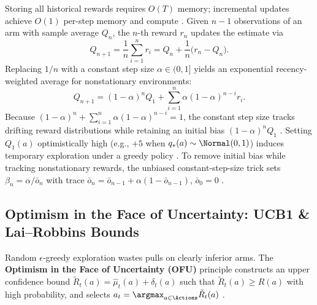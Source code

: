 \documentclass[../../../../master.tex]{subfiles}
\begin{document}
Storing all historical rewards requires $O(T)$ memory; incremental updates achieve $O(1)$ per-step memory and compute . Given $n-1$ observations of an arm with sample average $Q_n$, the $n$-th reward $r_n$ updates the estimate via
\begin{equation}
  Q_{n+1} = \frac{1}{n}\sum_{i=1}^n r_i = Q_n + \frac{1}{n}\bigl(r_n - Q_n\bigr).
  \label{eq:bandit:incremental}
\end{equation}
Replacing $1/n$ with a constant step size $\alpha \in (0,1]$ yields an exponential recency-weighted average for nonstationary environments:
\begin{equation}
  Q_{n+1} = (1-\alpha)^n Q_1 + \sum_{i=1}^n \alpha(1-\alpha)^{n-i} r_i.
  \label{eq:bandit:exp_recency}
\end{equation}
Because $(1-\alpha)^n + \sum_{i=1}^n \alpha(1-\alpha)^{n-i} = 1$, the constant step size tracks drifting reward distributions while retaining an initial bias $(1-\alpha)^n Q_1$ . Setting $Q_1(a)$ optimistically high (e.g., $+5$ when $q_*(a)\sim\Normal(0,1)$) induces temporary exploration under a greedy policy . To remove initial bias while tracking nonstationary rewards, the unbiased constant-step-size trick sets $\beta_n = \alpha/\bar{o}_n$ with trace $\bar{o}_n = \bar{o}_{n-1} + \alpha(1 - \bar{o}_{n-1})$, $\bar{o}_0 = 0$ .

\subsection{Optimism in the Face of Uncertainty: UCB1 \& Lai--Robbins Bounds}

Random $\epsilon$-greedy exploration wastes pulls on clearly inferior arms. The \textbf{Optimism in the Face of Uncertainty (OFU)} principle constructs an upper confidence bound $\tilde{R}_t(a) = \hat{\mu}_t(a) + \delta_t(a)$ such that $\tilde{R}_t(a) \ge R(a)$ with high probability, and selects $a_t = \argmax_{a \in \Actions} \tilde{R}_t(a)$ .
\end{document}
